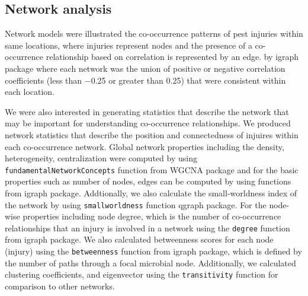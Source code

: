 \subsection*{Network analysis}

Network models were illustrated the co-occurrence patterns of pest injuries within same locations, where injuries represent nodes and the presence of a co-occurrence relationship based on correlation is represented by an edge. by igraph package where each network was the union of positive or negative correlation coefficients (less than −0.25 or greater than 0.25) that were consistent within each location. 

We were also interested in generating statistics that describe the network that may be important for understanding co-occurrence relationships. We produced network statistics that describe the position and connectedness of injuires within each co-occurrence network. Global network properties including the density, heterogeneity, centralization were computed by using \texttt{fundamentalNetworkConcepts} function from  WGCNA package and for the basic properties such as number of nodes, edges can be computed by using functions from igraph package. Addtionally, we also calculate the small-worldness index of the network by using \texttt{smallworldness} function qgraph package.  For the node-wise properties including node degree, which is the number of co-occurrence relationships that an injury is involved in a network using the \texttt{degree} function from igraph package. We also calculated betweenness scores for each node (injury) using the \texttt{betweenness} function from igraph package, which is defined by the number of paths through a focal microbial node. Additionally, we calculated clustering coefficients, and eigenvector using the \texttt{transitivity} function for comparison to other networks.

